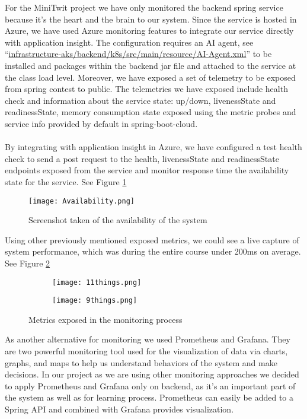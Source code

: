 For the MiniTwit project we have only monitored the backend spring service because it's the heart and the brain to our system. Since the service is hosted in Azure, we have used Azure monitoring features to integrate our service directly with application insight. The configuration requires an AI agent, see “\url{infrastructure-aks/backend/k8s/src/main/resource/AI-Agent.xml}” to be installed and packages within the backend jar file and attached to the service at the class load level. Moreover, we have exposed a set of telemetry to be exposed from spring contest to public. The telemetries we have exposed include health check and information about the service state: up/down, livenessState and readinessState, memory consumption state exposed using the metric probes and service info provided by default in spring-boot-cloud.
\\\\
By integrating with application insight in Azure, we have configured a test health check to send a post request to the health, livenessState and readinessState endpoints exposed from the service and monitor response time the availability state for the service. See Figure \ref{fig:availability} 
\begin{figure}[h]
    \centering
    \texttt{[image: Availability.png]}
    \caption{Screenshot taken of the availability of the system}
    \label{fig:availability}
\end{figure}

Using other previously mentioned exposed metrics, we could see a live capture of system performance, which was during the entire course under 200ms on average. See Figure \ref{fig:metrics} 
\begin{figure}[h]
    \centering
    \begin{subfigure}[b]{0.49\textwidth}
        \texttt{[image: 11things.png]}
    \end{subfigure}
    \hfill
        \begin{subfigure}[b]{0.49\textwidth}
        \texttt{[image: 9things.png]}
    \end{subfigure}
    \caption{Metrics exposed in the monitoring process}
    \label{fig:metrics}
\end{figure}

As another alternative for monitoring we used Prometheus and Grafana. They are two powerful monitoring tool used for the visualization of data via charts, graphs, and maps to help us understand behaviors of the system and make decisions. 
 In our project as we are using other monitoring approaches we decided to apply Prometheus and Grafana only on backend, as it's an important part of the system as well as for learning process.
Prometheus can easily be added to a Spring API and combined with Grafana provides visualization.

